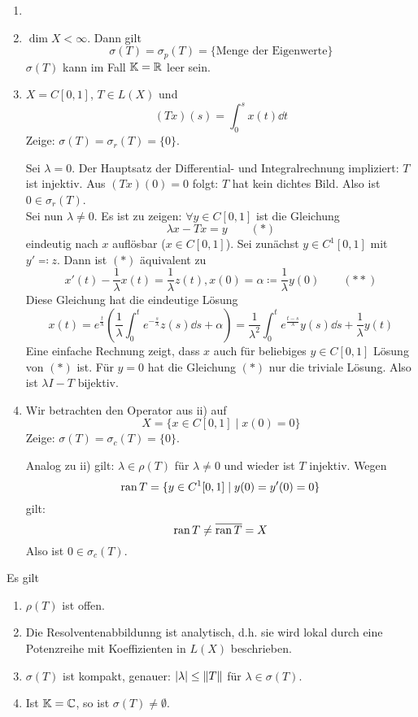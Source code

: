 \begin{beispiel*}
	\begin{enumerate}
		\item[]
		\item $ \dim X<\infty $. Dann gilt
		\[ \sigma(T)=\sigma_p(T)=\lbrace\text{Menge der Eigenwerte}\rbrace \]
		$ \sigma(T) $ kann im Fall $ \mathbb{K}=\mathbb{R} $ leer sein.
		\item $ X=C[0,1] $, $ T\in L(X) $ und \[ (Tx)(s)=\int_0^s x(t)\dd t \]
		Zeige: $ \sigma(T)=\sigma_r(T)=\lbrace 0\rbrace $.
	    \begin{beweis}
		    Sei $ \lambda =0 $. Der Hauptsatz der Differential- und Integralrechnung impliziert: $ T $ ist injektiv. Aus $ (Tx)(0)=0 $ folgt: $ T $ hat kein dichtes Bild. Also ist $ 0\in\sigma_r(T) $.\\
		    Sei nun $ \lambda\neq 0 $. Es ist zu zeigen: $ \forall y\in C[0,1] $ ist die Gleichung
		    \[ \lambda x-Tx=y\qquad(\ast) \]
		    eindeutig nach $ x $ aufl\"osbar ($ x\in C[0,1] $). Sei zun\"achst $ y\in C^1[0,1] $ mit $ y'\eqqcolon z $. Dann ist $ (\ast) $ \"aquivalent zu
		    \[ x'(t)-\frac{1}{\lambda}x(t)=\frac{1}{\lambda} z(t), x(0)=\alpha\coloneqq\frac{1}{\lambda}y(0)\qquad(\ast\ast) \]
		    Diese Gleichung hat die eindeutige L\"osung
		    \[ x(t)=e^\frac{t}{\lambda}\left(\frac{1}{\lambda}\int_0^t e^{-\frac{s}{\lambda}}z(s)\dd s+\alpha\right)=\frac{1}{\lambda^2}\int_0^t e^\frac{t-s}{\lambda}y(s)\dd s+\frac{1}{\lambda}y(t) \]
		    Eine einfache Rechnung zeigt, dass $ x $ auch f\"ur beliebiges $ y\in C[0,1] $ L\"osung von $ (\ast) $ ist. F\"ur $ y=0 $ hat die Gleichung $ (\ast) $ nur die triviale L\"osung. Also ist $ \lambda I-T $ bijektiv.
	    \end{beweis}
	    \item Wir betrachten den Operator aus ii) auf
	    \[ X=\lbrace x\in C[0,1]\mid x(0)=0\rbrace \]
	    Zeige: $ \sigma(T)=\sigma_c(T)=\lbrace 0\rbrace $.
	    \begin{beweis}
	    	Analog zu ii) gilt: $ \lambda\in\rho(T) $ f\"ur $ \lambda\neq 0 $ und wieder ist $ T $ injektiv. Wegen
	    	\[ \operatorname{ran} T=\lbrace y\in C^1[0,1]\mid y(0)=y'(0)=0\rbrace \]
	    	gilt:
	    	\[ \operatorname{ran} T\neq\overline{\operatorname{ran} T}=X \]
	    	Also ist $ 0\in\sigma_c(T) $.
	    \end{beweis}
	\end{enumerate}
\end{beispiel*}
\begin{satz}
	Es gilt
	\begin{enumerate}
		\item $ \rho(T) $ ist offen.
		\item Die Resolventenabbildunng ist analytisch, d.h. sie wird lokal durch eine Potenzreihe mit Koeffizienten in $ L(X) $ beschrieben.
		\item $ \sigma(T) $ ist kompakt, genauer: $ |\lambda|\leq\left\|T\right\| $ f\"ur $ \lambda\in\sigma(T) $.
		\item Ist $ \mathbb{K}=\mathbb{C} $, so ist $ \sigma(T)\neq\emptyset $.
	\end{enumerate}
\end{satz}
